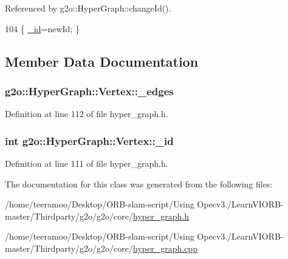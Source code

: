 Referenced by g2o\+::\+Hyper\+Graph\+::change\+Id().


\begin{DoxyCode}
104 \{ \hyperlink{classg2o_1_1HyperGraph_1_1Vertex_ac643fa36a6d666d64925281b11de9b92}{\_id}=newId; \}
\end{DoxyCode}


\subsection{Member Data Documentation}
\subsubsection[{\texorpdfstring{\+\_\+edges}{_edges}}]{ g2o\+::\+Hyper\+Graph\+::\+Vertex\+::\+\_\+edges\hspace{0.3cm}{\ttfamily [protected]}}\hypertarget{classg2o_1_1HyperGraph_1_1Vertex_a8d732ebb72a545332a5bdc478b558430}{}\label{classg2o_1_1HyperGraph_1_1Vertex_a8d732ebb72a545332a5bdc478b558430}


Definition at line 112 of file hyper\+\_\+graph.\+h.

\subsubsection[{\texorpdfstring{\+\_\+id}{_id}}]{\setlength{\rightskip}{0pt plus 5cm}int g2o\+::\+Hyper\+Graph\+::\+Vertex\+::\+\_\+id\hspace{0.3cm}{\ttfamily [protected]}}\hypertarget{classg2o_1_1HyperGraph_1_1Vertex_ac643fa36a6d666d64925281b11de9b92}{}\label{classg2o_1_1HyperGraph_1_1Vertex_ac643fa36a6d666d64925281b11de9b92}


Definition at line 111 of file hyper\+\_\+graph.\+h.



The documentation for this class was generated from the following files\+:\begin{DoxyCompactItemize}
\item 
/home/teeramoo/\+Desktop/\+O\+R\+B-\/slam-\/script/\+Using Opecv3./\+Learn\+V\+I\+O\+R\+B-\/master/\+Thirdparty/g2o/g2o/core/\hyperlink{hyper__graph_8h}{hyper\+\_\+graph.\+h}\item 
/home/teeramoo/\+Desktop/\+O\+R\+B-\/slam-\/script/\+Using Opecv3./\+Learn\+V\+I\+O\+R\+B-\/master/\+Thirdparty/g2o/g2o/core/\hyperlink{hyper__graph_8cpp}{hyper\+\_\+graph.\+cpp}\end{DoxyCompactItemize}
